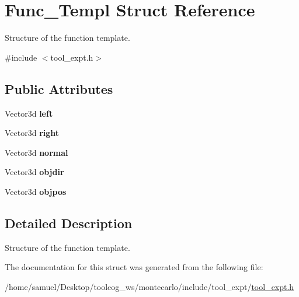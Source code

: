 \hypertarget{structFunc__Templ}{}\section{Func\+\_\+\+Templ Struct Reference}
\label{structFunc__Templ}


Structure of the function template.  




{\ttfamily \#include $<$tool\+\_\+expt.\+h$>$}

\subsection*{Public Attributes}
\begin{DoxyCompactItemize}
\item 
\mbox{\label{structFunc__Templ_a204890a5e37c7857e641536ee921d6cc}} 
Vector3d {\bfseries left}
\item 
\mbox{\label{structFunc__Templ_a080467ebb48a80d03bb32a29e30effb3}} 
Vector3d {\bfseries right}
\item 
\mbox{\label{structFunc__Templ_abe4c0c3a70b8a04955dd8ef2c38e86ee}} 
Vector3d {\bfseries normal}
\item 
\mbox{\label{structFunc__Templ_ad609bc26b01bf581c94f97475acc0c5c}} 
Vector3d {\bfseries objdir}
\item 
\mbox{\label{structFunc__Templ_a6145d9afe09af59b6fc7338402fd2316}} 
Vector3d {\bfseries objpos}
\end{DoxyCompactItemize}


\subsection{Detailed Description}
Structure of the function template. 

The documentation for this struct was generated from the following file\+:\begin{DoxyCompactItemize}
\item 
/home/samuel/\+Desktop/toolcog\+\_\+ws/montecarlo/include/tool\+\_\+expt/\hyperlink{tool__expt_8h}{tool\+\_\+expt.\+h}\end{DoxyCompactItemize}

